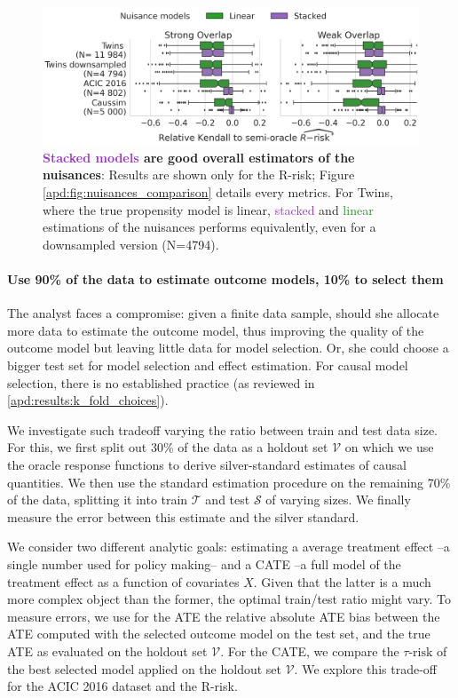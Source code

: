 \documentclass{report}
\begin{document}
\begin{figure}[!tb]
  \includegraphics[width=\linewidth]{img/chapter_5/_4_nuisance_models_r_risk_only_3datasets.png}

  \caption{\textbf{\textcolor{DarkOrchid}{Stacked
        models} are good overall estimators of the nuisances}:
    Results are shown only for the
    R-risk; Figure \ref{apd:fig:nuisances_comparison}
    details every metrics. For Twins, where the true propensity
    model is linear, \textcolor{DarkOrchid}{stacked} and
    \textcolor{ForestGreen}{linear}
    estimations of the nuisances performs equivalently, even for a downsampled version
    (N=4794). }\label{fig:all_datasets_nuisances_comparison}
\end{figure}

\paragraph{Use 90\% of the data to estimate outcome models, 10\% to
  select them}

The analyst faces a compromise: given a finite
data sample, should she allocate more data to estimate the outcome model,
thus improving the quality of the outcome model but leaving
little data for model selection. Or, she could choose a bigger test set for
model selection and effect estimation. For causal model selection, there
is no established practice (as reviewed in \ref{apd:results:k_fold_choices}).

We investigate such tradeoff varying the ratio between train and test
data size. For this, we first split out 30\% of the data as a holdout set
$\mathcal{V}$ on which we use the oracle response functions to derive
silver-standard estimates of causal quantities. We then
use the standard estimation procedure on the remaining 70\% of the data,
splitting it into train $\mathcal{T}$ and test $\mathcal{S}$ of varying
sizes. We finally measure the error between this estimate and the
silver standard.

We consider two different analytic goals: estimating a average
treatment effect --a single number used for policy making-- and a
CATE --a full model of the treatment effect as a function of covariates
$X$. Given that the latter is a much more complex object than the former,
the optimal train/test ratio might vary. To measure errors, we use for
the ATE the relative absolute ATE bias between the ATE computed with the
selected outcome model on the test set, and the true ATE as evaluated on
the holdout set $\mathcal{V}$. For the CATE, we compare the
$\tau\text{-risk}$
of the best selected model applied on the holdout set $\mathcal{V}$. We explore this trade-off for the ACIC 2016 dataset and the R-risk.
\end{document}
